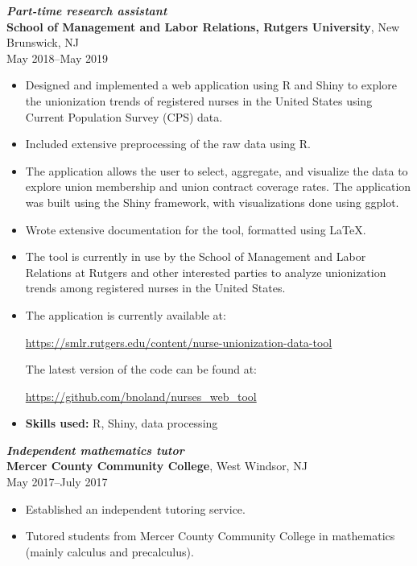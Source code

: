 \documentclass[letterpaper,12pt]{article}
\begin{document}
\textit{\textbf{Part-time research assistant}} \\
\textbf{School of Management and Labor Relations, Rutgers University},
New Brunswick, NJ \\
May 2018--May 2019
\begin{itemize}
\item Designed and implemented a web application using R and Shiny to
  explore the unionization trends of registered nurses in the United
  States using Current Population Survey (CPS) data.
\item Included extensive preprocessing of the raw data using R.
\item The application allows the user to select, aggregate, and
  visualize the data to explore union membership and union contract
  coverage rates. The application was built using the Shiny framework,
  with visualizations done using ggplot.
\item Wrote extensive documentation for the tool, formatted using
  \LaTeX.
\item The tool is currently in use by the School of Management and
  Labor Relations at Rutgers and other interested parties to analyze
  unionization trends among registered nurses in the United States.
\item The application is currently available at:
  \begin{center}
    \url{https://smlr.rutgers.edu/content/nurse-unionization-data-tool}
  \end{center}
  The latest version of the code can be found at:
  \begin{center}
    \url{https://github.com/bnoland/nurses_web_tool}
  \end{center}
\item \textbf{Skills used:} R, Shiny, data processing
\end{itemize}

\textit{\textbf{Independent mathematics tutor}} \\
\textbf{Mercer County Community College},
West Windsor, NJ \\
May 2017--July 2017
\begin{itemize}
\item Established an independent tutoring service.
\item Tutored students from Mercer County Community College in
  mathematics (mainly calculus and precalculus).
\end{itemize}
\end{document}

